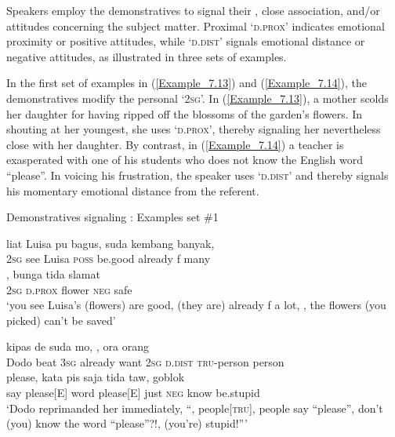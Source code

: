 {

Speakers employ the de\-mon\-stratives to signal their , close association, and/or attitudes concerning the subject matter. Proximal  ‘\textsc{d.prox}’ indicates emotional proximity or positive attitudes, while  ‘\textsc{d.dist}’ signals emotional distance or negative attitudes, as illustrated in three sets of examples.



In the first set of examples in (\ref{Example_7.13}) and (\ref{Example_7.14}), the demonstratives modify the personal   ‘\textsc{2sg}’. In (\ref{Example_7.13}), a mother scolds her daughter for having ripped off the blossoms of the garden’s flowers. In shouting at her youngest, she uses  ‘\textsc{d.prox}’, thereby signaling her nevertheless close  with her daughter. By contrast, in (\ref{Example_7.14}) a teacher is exasperated with one of his students who does not know the English word ``please''. In voicing his frustration, the speaker uses  ‘\textsc{d.dist}’ and thereby signals his momentary emotional distance from the referent.


\begin{styleExampleTitle}
Demonstratives signaling : Examples set \#1
\end{styleExampleTitle}

\ea
\label{Example_7.13}
 {liat} {{Luisa}} {{pu}} {{bagus,}} {suda} {kembang} {banyak,}\\ %
 \textsc{2sg}  see  {Luisa}  {\textsc{poss}}  {be.good}  already  f  many\\
\gll  {}  {,}  {bunga}  {tida}  {slamat}\\
 \textsc{2sg}  {\textsc{d.prox}}  {flower}  {\textsc{neg}}  {safe}\\
 ‘you see Luisa’s (flowers) are good, (they are) already f a lot, \bluebold{)}, the flowers (you picked) can’t be saved’ \textstyleExampleSource{[081006-021-CvHt.0002]}
\z

\ea
\label{Example_7.14}
 {{kipas}} {{de}} {{suda}} {mo,} {{}} {{,}} {{ora}} {orang}\\ %
 Dodo  {beat}  {\textsc{3sg}}  {already}  want  {\textsc{2sg}}  {\textsc{d.dist}}  {\textsc{tru}{}-person}  person\\
  {please,}  {kata}  {pis}  {saja}  tida  {taw,}  {goblok}\\
 {say}  {please[E]}  {word}  {please[E]}  {just}  \textsc{neg}  {know}  {be.stupid}\\
\glt 
‘Dodo reprimanded her immediately, ``, people[\textsc{tru}], people say ``please'', don’t (you) know the word ``please''?!, (you’re) stupid!''' \textstyleExampleSource{[081115-001a-Cv.0140]}
\z



}
